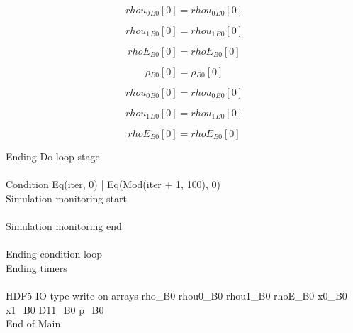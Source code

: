 \documentclass{article}
\begin{document}
\begin{dmath}{rhou_{0}{_{B0}}}[{0}] = {rhou_{0}{_{B0}}}[{0}]\end{dmath}

\begin{dmath}{rhou_{1}{_{B0}}}[{0}] = {rhou_{1}{_{B0}}}[{0}]\end{dmath}

\begin{dmath}{rhoE{_{B0}}}[{0}] = {rhoE{_{B0}}}[{0}]\end{dmath}

\begin{dmath}{\rho{_{B0}}}[{0}] = {\rho{_{B0}}}[{0}]\end{dmath}

\begin{dmath}{rhou_{0}{_{B0}}}[{0}] = {rhou_{0}{_{B0}}}[{0}]\end{dmath}

\begin{dmath}{rhou_{1}{_{B0}}}[{0}] = {rhou_{1}{_{B0}}}[{0}]\end{dmath}

\begin{dmath}{rhoE{_{B0}}}[{0}] = {rhoE{_{B0}}}[{0}]\end{dmath}

\noindent Ending Do loop stage\\
\\\noindent Condition Eq(iter, 0) | Eq(Mod(iter + 1, 100), 0)\\\noindent Simulation monitoring start\\
\\\noindent Simulation monitoring end\\
\\\noindent Ending condition loop %
\\\noindent Ending timers\\
\\\noindent HDF5 IO type write on arrays rho_B0 rhou0_B0 rhou1_B0 rhoE_B0 x0_B0 x1_B0 D11_B0 p_B0\\\noindent End of Main\\
\end{document}
